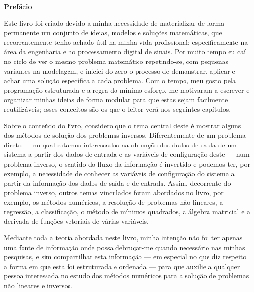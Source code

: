 \cleardoublepage
\newpage
\thispagestyle{empty}

\vfill
\begin{center}
\textbf{\LARGE  Prefácio }
\end{center}

Este livro foi criado devido a minha necessidade de materializar de forma permanente
um conjunto de ideias, modelos e soluções matemáticas, que recorrentemente
tenho achado útil na minha vida profissional;
especificamente na área da engenharia e no processamento digital de sinais.
Por muito tempo eu caí no ciclo de ver o mesmo problema matemático repetindo-se,
com pequenas variantes na modelagem,  
e iniciei do zero o processo de demonstrar, aplicar e achar uma solução específica a cada problema.
Com o tempo, meu gosto pela programação estruturada e a regra do mínimo esforço,
me motivaram a escrever e organizar minhas ideias de forma modular
para que estas sejam facilmente reutilizáveis; 
esses conceitos são os que o leitor verá nos seguintes capítulos.

Sobre o conteúdo do livro, 
considero que o tema central deste é mostrar alguns dos métodos de solução dos problemas inversos.
Diferentemente de um problema direto 
--- no qual estamos interessados na obtenção dos dados de saída de um sistema
a partir dos dados de entrada e as variáveis de configuração deste --- 
num problema inverso, o sentido do fluxo da informação é invertido e podemos ter, por exemplo,
a necessidade de conhecer as variáveis de configuração do sistema a partir da informação
dos dados de saída e de entrada.
Assim, decorrente do problema inverso, 
outros temas vinculados foram abordados no livro,
por exemplo, os métodos numéricos, a resolução de problemas não lineares, 
a regressão, a classificação, o método de mínimos quadrados,
a álgebra matricial
e a derivada de funções vetoriais de várias variáveis.

Mediante toda a teoria abordada neste livro, 
minha intenção não foi ter apenas uma fonte de informação onde possa debruçar-me quando necessário nas minhas pesquisas,
e sim compartilhar esta informação 
--- em especial no que diz respeito a forma em que esta foi estruturada e ordenada ---
para que auxilie a qualquer pessoa interessada no estudo dos métodos numéricos
para a solução de problemas não lineares e inversos.

\vfill

